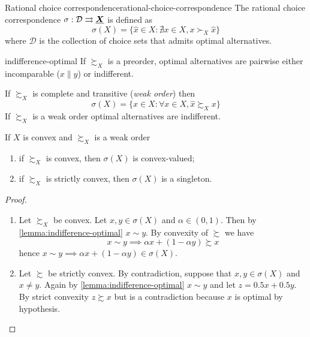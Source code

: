 \documentclass[12pt]{extarticle}
\renewcommand{\vec}[1]{\uvec{#1}}
\begin{document}
\begin{definition}{Rational choice correspondence}{rational-choice-correspondence}
    The rational choice correspondence $\sigma : \mathcal D \rightrightarrows \vec X$ is defined as
    \begin{equation}
        \sigma (X) = \{ \hat x \in X: \nexists x \in X, x \succ_X \hat x \}
    \end{equation}
    where $\mathcal D$ is the collection of choice sets that admits optimal alternatives.
\end{definition}

\begin{lemma}{}{indifference-optimal}
    If $\succsim_X$ is a preorder, optimal alternatives are pairwise either incomparable ($x \parallel y$) or indifferent.
\end{lemma}

If $\succsim_X$ is complete and transitive (\emph{weak order}) then
\begin{equation}
    \sigma(X) = \{\hat x \in X : \forall x \in X, \hat x \succsim_X x\}
\end{equation}
If $\succsim_X$ is a weak order optimal alternatives are indifferent.

\begin{proposition}{}{}
    If $X$ is convex and $\succsim_X$ is a weak order
    \begin{enumerate}[label=\roman*.]
        \item if $\succsim_X$ is convex, then $\sigma(X)$ is convex-valued;
        \item if $\succsim_X$ is strictly convex, then $\sigma(X)$ is a singleton.
    \end{enumerate}
\end{proposition}

\begin{proof}
    \skiplineafterproof
    \begin{enumerate}[label=\roman*.]
        \item Let $\succsim_X$ be convex.
              Let $x, y \in \sigma (X)$ and $\alpha \in (0,1)$. Then by \cref{lemma:indifference-optimal} $x \sim y$.
              By convexity of $\succsim$ we have
              \begin{equation}
                  x \sim y \implies \alpha x + (1- \alpha y) \succsim x
              \end{equation}
              hence
              $x \sim y \implies \alpha x + (1- \alpha y) \in \sigma(X)$.

        \item Let $\succsim$ be strictly convex.
              By contradiction, suppose that $x, y \in \sigma(X)$ and $x \neq y$.
              Again by \cref{lemma:indifference-optimal} $x \sim y$ and let $z = 0.5 x + 0.5 y$.
              By strict convexity $z \succsim x$ but is a contradiction because $x$ is optimal by hypothesis.
    \end{enumerate}
\end{proof}
\end{document}
